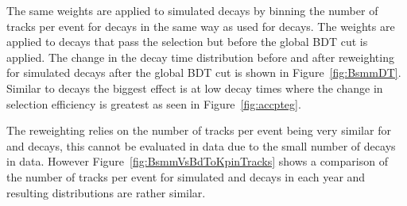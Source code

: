 The same weights are applied to simulated \bsmumu decays by binning the number of tracks per event for \bsmumu decays in the same way as used for \bdkpi decays. The weights are applied to decays that pass the selection but before the global BDT cut is applied. The change in the decay time distribution before and after reweighting for \bsmuu simulated decays after the global BDT cut is shown in Figure~\ref{fig:BsmmDT}. %
Similar to \bdkpi decays the biggest effect is at low decay times where the change in selection efficiency is greatest as seen in Figure~\ref{fig:accpteg}.

The reweighting relies on the number of tracks per event being very similar for \bdkpi and \bsmumu decays, this cannot be evaluated in data due to the small number of \bsmumu decays in data. However Figure~\ref{fig:BsmmVsBdToKpinTracks} shows a comparison of the number of tracks per event for simulated \bsmumu and \bdkpi decays in each year and resulting distributions are rather similar.



